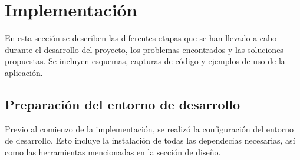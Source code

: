 \chapter{Implementación}

En esta sección se describen las diferentes etapas que se han llevado a cabo durante el desarrollo del proyecto, los problemas encontrados y las soluciones propuestas. Se incluyen esquemas, capturas de código y ejemplos de uso de la aplicación.\newline

\section{Preparación del entorno de desarrollo}

Previo al comienzo de la implementación, se realizó la configuración del entorno de desarrollo. Esto incluye la instalación de todas las dependecias necesarias, así como las herramientas mencionadas en la sección de diseño.